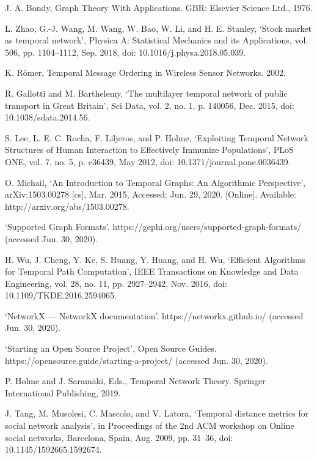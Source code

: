 \begin{thebibliography}{30}

J. A. Bondy, Graph Theory With Applications. GBR: Elsevier Science Ltd., 1976.

L. Zhao, G.-J. Wang, M. Wang, W. Bao, W. Li, and H. E. Stanley, ‘Stock market as temporal network’, Physica A: Statistical Mechanics and its Applications, vol. 506, pp. 1104–1112, Sep. 2018, doi: 10.1016/j.physa.2018.05.039.

K. Römer, Temporal Message Ordering in Wireless Sensor Networks. 2002.

R. Gallotti and M. Barthelemy, ‘The multilayer temporal network of public transport in Great Britain’, Sci Data, vol. 2, no. 1, p. 140056, Dec. 2015, doi: 10.1038/sdata.2014.56.

S. Lee, L. E. C. Rocha, F. Liljeros, and P. Holme, ‘Exploiting Temporal Network Structures of Human Interaction to Effectively Immunize Populations’, PLoS ONE, vol. 7, no. 5, p. e36439, May 2012, doi: 10.1371/journal.pone.0036439.

O. Michail, ‘An Introduction to Temporal Graphs: An Algorithmic Perspective’, arXiv:1503.00278 [cs], Mar. 2015, Accessed: Jun. 29, 2020. [Online]. Available: http://arxiv.org/abs/1503.00278.

‘Supported Graph Formats’. https://gephi.org/users/supported-graph-formats/ (accessed Jun. 30, 2020).

H. Wu, J. Cheng, Y. Ke, S. Huang, Y. Huang, and H. Wu, ‘Efficient Algorithms for Temporal Path Computation’, IEEE Transactions on Knowledge and Data Engineering, vol. 28, no. 11, pp. 2927–2942, Nov. 2016, doi: 10.1109/TKDE.2016.2594065.

‘NetworkX — NetworkX documentation’. https://networkx.github.io/ (accessed Jun. 30, 2020).

‘Starting an Open Source Project’, Open Source Guides. https://opensource.guide/starting-a-project/ (accessed Jun. 30, 2020).

P. Holme and J. Saramäki, Eds., Temporal Network Theory. Springer International Publishing, 2019.

J. Tang, M. Musolesi, C. Mascolo, and V. Latora, ‘Temporal distance metrics for social network analysis’, in Proceedings of the 2nd ACM workshop on Online social networks, Barcelona, Spain, Aug. 2009, pp. 31–36, doi: 10.1145/1592665.1592674.


\end{thebibliography}
